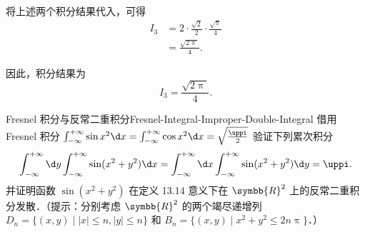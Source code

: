 \begin{solution}
    将上述两个积分结果代入，可得
    \begin{equation}
        \begin{aligned}
            I_3 & = 2 \cdot \frac{\sqrt{2}}{2} \cdot \frac{\sqrt{\uppi}}{4} \\
                & = \frac{\sqrt{2\uppi}}{4}.
        \end{aligned}
    \end{equation}

    因此，积分结果为
    \begin{equation}
        I_3 = \boxed{\frac{\sqrt{2\uppi}}{4}}.
    \end{equation}
\end{solution}

\begin{problem}{Fresnel 积分与反常二重积分}{Fresnel-Integral-Improper-Double-Integral}
    借用 Fresnel 积分 $\int_{-\infty}^{+\infty} \sin x^2 \d x = \int_{-\infty}^{+\infty} \cos x^2 \d x = \sqrt{\frac{\uppi}{2}}$ 验证下列累次积分
    \begin{equation}
        \int_{-\infty}^{+\infty} \d y \int_{-\infty}^{+\infty} \sin(x^2 + y^2) \d x = \int_{-\infty}^{+\infty} \d x \int_{-\infty}^{+\infty} \sin(x^2 + y^2) \d y = \uppi.
    \end{equation}
    并证明函数 $\sin(x^2 + y^2)$ 在定义 13.14 意义下在 $\symbb{R}^2$ 上的反常二重积分发散．（提示：分别考虑 $\symbb{R}^2$ 的两个竭尽递增列 $D_n = \{ (x,y) \mid |x| \leqslant n, |y| \leqslant n \}$ 和 $B_n = \{ (x,y) \mid x^2 + y^2 \leqslant 2n\uppi \}$．）
\end{problem}

